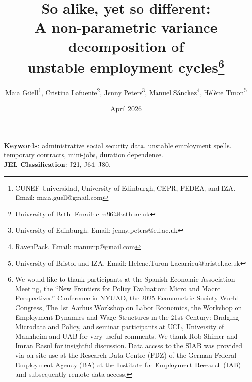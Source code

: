 \documentclass[12pt]{article}
\title{\vspace{-2cm}
So alike, yet so different:\\
A non-parametric variance decomposition of \\ 
unstable employment cycles\thanks{We would like to thank participants at the Spanish Economic Association Meeting, 
the  ``New Frontiers for Policy Evaluation: Micro and Macro Perspectives'' Conference in NYUAD, the 2025 Econometric Society World Congress, The 1st Aarhus Workshop on Labor Economics, the Workshop on Employment Dynamics and Wage Structures in the 21st Century: Bridging Microdata and Policy, and seminar participants at UCL,  University of Mannheim and UAB for very useful comments. 
We thank Rob Shimer and Imran Rasul  for insightful discussion.
Data access to the SIAB was provided via on-site use at the Research Data Centre (FDZ) of the German
Federal Employment Agency (BA) at the Institute for Employment Research (IAB) and
subsequently remote data access.}}
\author{Maia Güell\footnote{CUNEF Universidad,  University of Edinburgh, CEPR, FEDEA, and IZA. Email:  maia.guell@gmail.com},
Cristina Lafuente\footnote{University of Bath. Email: 
clm96@bath.ac.uk},
Jenny Peters\footnote{University of Edinburgh. Email: jenny.peters@ed.ac.uk},
Manuel Sánchez\footnote{RavenPack. Email: manuzrp@gmail.com}, 
H\'{e}l\`{e}ne Turon\footnote{ University of Bristol and IZA. Email: Helene.Turon-Lacarrieu@bristol.ac.uk}
}
\date{April 2026}
\theoremstyle{definition}
\theoremstyle{remark}
\begin{document}
\vspace{-1.5cm}

\maketitle

\vspace{-1.5cm}
\begin{abstract}
\singlespacing 



\end{abstract}



\noindent \textbf{Keywords}: administrative social security data, unstable employment spells, temporary contracts, mini-jobs, duration dependence. \\
\textbf{JEL Classification}: {J21}, {J64}, {J80}.
\end{document}

